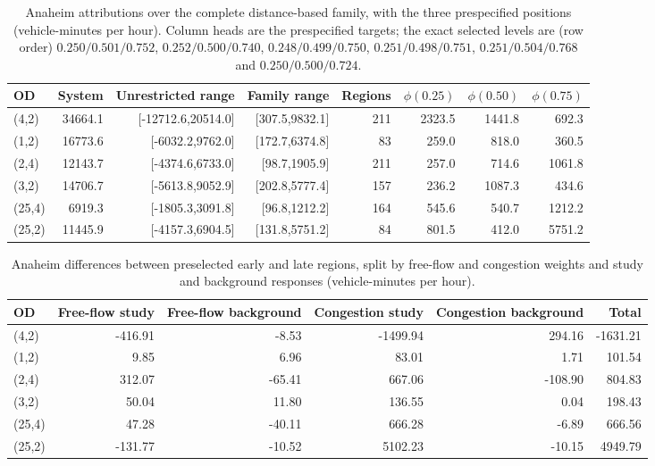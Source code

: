 \begin{table}[pos=htbp]\centering\footnotesize\caption{Anaheim attributions over the complete distance-based family, with the three prespecified positions (vehicle-minutes per hour). Column heads are the prespecified targets; the exact selected levels are (row order) $0.250/0.501/0.752$, $0.252/0.500/0.740$, $0.248/0.499/0.750$, $0.251/0.498/0.751$, $0.251/0.504/0.768$ and $0.250/0.500/0.724$.}\label{tab:anaheim}\begin{tabular}{lrrrrrrr}\toprule OD & System & Unrestricted range & Family range & Regions & $\phi(0.25)$ & $\phi(0.50)$ & $\phi(0.75)$\\\midrule
(4,2) & 34664.1 & [-12712.6,20514.0] & [307.5,9832.1] & 211 & 2323.5 & 1441.8 & 692.3\\
(1,2) & 16773.6 & [-6032.2,9762.0] & [172.7,6374.8] & 83 & 259.0 & 818.0 & 360.5\\
(2,4) & 12143.7 & [-4374.6,6733.0] & [98.7,1905.9] & 211 & 257.0 & 714.6 & 1061.8\\
(3,2) & 14706.7 & [-5613.8,9052.9] & [202.8,5777.4] & 157 & 236.2 & 1087.3 & 434.6\\
(25,4) & 6919.3 & [-1805.3,3091.8] & [96.8,1212.2] & 164 & 545.6 & 540.7 & 1212.2\\
(25,2) & 11445.9 & [-4157.3,6904.5] & [131.8,5751.2] & 84 & 801.5 & 412.0 & 5751.2\\
\bottomrule\end{tabular}\end{table}
\begin{table}[pos=htbp]\centering\footnotesize\caption{Anaheim differences between preselected early and late regions, split by free-flow and congestion weights and study and background responses (vehicle-minutes per hour).}\label{tab:anaheimmechanism}\begin{tabular}{lrrrrr}\toprule OD & Free-flow study & Free-flow background & Congestion study & Congestion background & Total\\\midrule
(4,2) & -416.91 & -8.53 & -1499.94 & 294.16 & -1631.21\\
(1,2) & 9.85 & 6.96 & 83.01 & 1.71 & 101.54\\
(2,4) & 312.07 & -65.41 & 667.06 & -108.90 & 804.83\\
(3,2) & 50.04 & 11.80 & 136.55 & 0.04 & 198.43\\
(25,4) & 47.28 & -40.11 & 666.28 & -6.89 & 666.56\\
(25,2) & -131.77 & -10.52 & 5102.23 & -10.15 & 4949.79\\
\bottomrule\end{tabular}\end{table}

